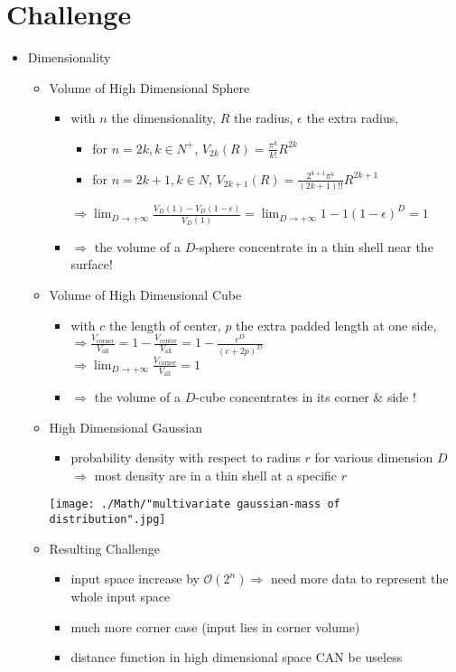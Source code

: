 \section{Challenge}
\begin{itemize}
\item Dimensionality
	\begin{itemize}
	\item Volume of High Dimensional Sphere
		\begin{itemize}
		\item with $n$ the dimensionality, $R$ the radius, $\epsilon$ the extra radius,
			\begin{itemize}
			\item for $n=2k, k\in N^+$, $V_{2k}(R) = \frac {\pi^k}{k!} R^{2k}$
			\item for $n=2k+1, k\in N$, $V_{2k+1}(R) = \frac {2^{k+1}\pi^k}{(2k+1)!!} R^{2k+1}$
			\end{itemize}
		$\displaystyle \Rightarrow \lim_{D\rightarrow+\infty} \frac {V_D(1)-V_D(1-\epsilon)}{V_D(1)} = \lim_{D\rightarrow+\infty}1-1(1-\epsilon)^D = 1$
		\item $\Rightarrow$ the volume of a $D$-sphere concentrate in a thin shell near the surface!
		\end{itemize}
	\item Volume of High Dimensional Cube
		\begin{itemize}
		\item with $c$ the length of center, $p$ the extra padded length at one side, \\
		$\Rightarrow \frac{V_\text{corner}}{V_\text{all}} = 1 - \frac{V_\text{center}}{V_\text{all}} = 1-\frac{c^D}{(c+2p)^D}$ \\
		$\displaystyle \Rightarrow \lim_{D\rightarrow+\infty}\frac{V_\text{corner}}{V_\text{all}}=1$ \\
		\item $\Rightarrow$ the volume of a $D$-cube concentrates in its corner \& side !
		\end{itemize}
	\item High Dimensional Gaussian
		\begin{itemize}
		\item probability density with respect to radius $r$ for various dimension $D$ \\
		$\Rightarrow$ most density are in a thin shell at a specific $r$			
		\end{itemize}
		\texttt{[image: ./Math/"multivariate gaussian-mass of distribution".jpg]}
	\item Resulting Challenge
		\begin{itemize}
		\item input space increase by $\mathcal O(2^n) \Rightarrow$ need more data to represent the whole input space
		\item much more corner case (input lies in corner volume)
		\item distance function in high dimensional space CAN be useless
		\end{itemize}
	\end{itemize}
\end{itemize}